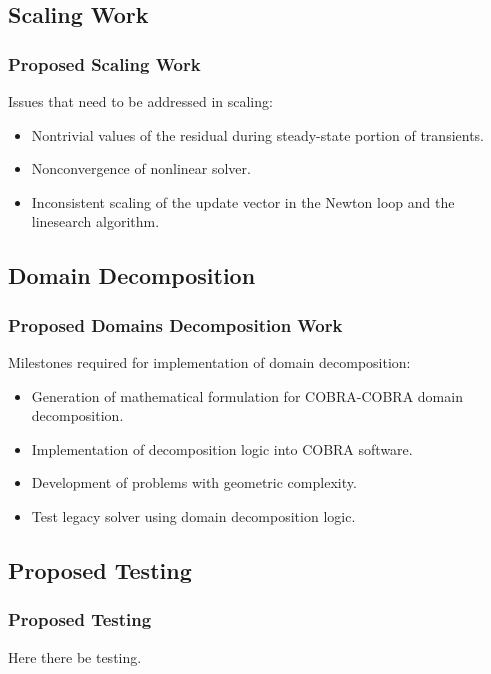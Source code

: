 \documentclass[compress,xcolor=table]{beamer}
\begin{document}
\subsection[Scaling]{Scaling Work}
\begin{frame}
\frametitle{Proposed Scaling Work}

Issues that need to be addressed in scaling:
\begin{itemize}
\item{Nontrivial values of the residual during steady-state portion of transients.}
\item{Nonconvergence of nonlinear solver.}
\item{Inconsistent scaling of the update vector in the Newton loop and the linesearch algorithm.} 
\end{itemize}

\end{frame}
\subsection[Domain Decomposition]{Domain Decomposition}
\begin{frame}
\frametitle{Proposed Domains Decomposition Work}

Milestones required for implementation of domain decomposition:

\begin{itemize}
\item{Generation of mathematical formulation for COBRA-COBRA domain decomposition.}
\item{Implementation of decomposition logic into COBRA software.}
\item{Development of problems with geometric complexity.}
\item{Test legacy solver using domain decomposition logic.} 
\end{itemize}

\end{frame}
\subsection[Testing]{Proposed Testing}
\begin{frame}
\frametitle{Proposed Testing}

Here there be testing.

\end{frame}
\end{document}
